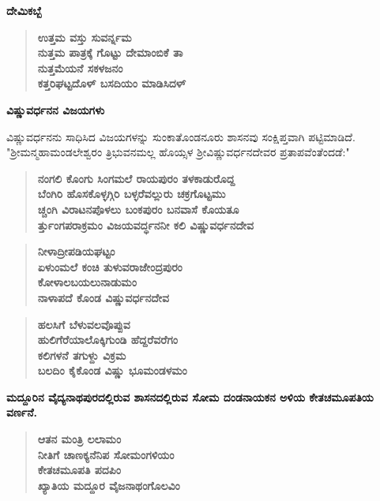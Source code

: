 \noindent
\textbf{ದೇಮಿಕಬ್ಬೆ}

\begin{verse}
\textbf{ಉತ್ತಮ ವಸ್ತು ಸುವರ್ನ್ನಮ\\ ನುತ್ತಮ ಪಾತ್ರಕ್ಕೆ ಗೊಟ್ಟು ದೇಮಾಂಬಿಕೆ ತಾ\\ ನುತ್ತಮೆಯನೆ ಸಕಳಜನಂ\\ ಕತ್ತರಿಘಟ್ಟದೊಳ್ ಬಸದಿಯಂ ಮಾಡಿಸಿದಳ್}
\end{verse}

\noindent
\textbf{ವಿಷ್ಣುವರ್ಧನನ ವಿಜಯಗಳು}

ವಿಷ್ಣುವರ್ಧನನು ಸಾಧಿಸಿದ ವಿಜಯಗಳನ್ನು ಸುಂಕಾತೊಂಡನೂರು ಶಾಸನವು ಸಂಕ್ಷಿಪ್ತವಾಗಿ ಪಟ್ಟಿಮಾಡಿದೆ. "ಶ‍್ರೀಮನ್ಮಹಾಮಂಡಲೇಶ್ವರಂ ತ್ರಿಭುವನಮಲ್ಲ ಹೊಯ್ಸಳ ಶ‍್ರೀವಿಷ್ಣುವರ್ಧನದೇವರ ಪ್ರತಾಪವೆಂತೆಂದಡೆ:"

\begin{verse}
\textbf{ನಂಗಲಿ ಕೊಂಗು ಸಿಂಗಮಲೆ ರಾಯಪುರಂ ತಳಕಾಡುರೊದ್ದ \\ ಬೆಂಗಿರಿ ಹೊಸಕೊಳ್ಳಗ್ಗಿರಿ ಬಳ್ಳರೆವಲ್ಲುರು ಚಕ್ರಗೊಟ್ಟಮು \\ ಚ್ಚಂಗಿ ವಿರಾಟನಪೊಳಲು ಬಂಕಪುರಂ ಬನವಾಸೆ ಕೊಯತೂ \\ರ್ತ್ತುಂಗಪರಾಕ್ರಮಂ ವಿಜಯವರ್ದ್ಧನನೀ ಕಲಿ ವಿಷ್ಣುವರ್ಧನದೇವ}
\end{verse}

\begin{verse}
\textbf{ನೀಳಾದ್ರೀಪಡಿಯಘಟ್ಟಂ \\ ಏಳುಂಮಲೆ ಕಂಚಿ ತುಳುವರಾಜೇಂದ್ರಪುರಂ \\ ಕೋಳಾಲಬಯಲುನಾಡುಮಂ \\ ನಾಳಾಪದೆ ಕೊಂಡ ವಿಷ್ಣುವರ್ಧನದೇವ}
\end{verse}

\begin{verse}
\textbf{ಹಲಸಿಗೆ ಬೆಳುವಲವೊಪ್ಪುವ \\ ಹುಲಿಗೆರೆಯಾಲೊಕ್ಕಿಗುಂಡಿ ಹೆದ್ದರೆವರೆಗಂ \\ ಕಲಿಗಳನೆ ತಗುಳ್ದು ವಿಕ್ರಮ \\ ಬಲದಿಂ ಕೈಕೊಂಡ ವಿಷ್ಣು ಭೂಮಂಡಳಮಂ}
\end{verse}

\noindent
\textbf{ಮದ್ದೂರಿನ ವೈದ್ಯನಾಥಪುರದಲ್ಲಿರುವ ಶಾಸನದಲ್ಲಿರುವ ಸೋಮ ದಂಡನಾಯಕನ ಅಳಿಯ ಕೇತಚಮೂಪತಿಯ ವರ್ಣನೆ.}

\begin{verse}
\textbf{ಆತನ ಮಂತ್ರಿ ಲಲಾಮಂ \\ ನೀತಿಗೆ ಚಾಣಕ್ಯನೆನಿಪ ಸೋಮಂಗಳಿಯಂ \\ ಕೇತಚಮೂಪತಿ ಪದಪಿಂ \\ ಖ್ಯಾತಿಯ ಮದ್ದೂರ ವೈಜನಾಥಂಗೊಲವಿಂ}
\end{verse}

